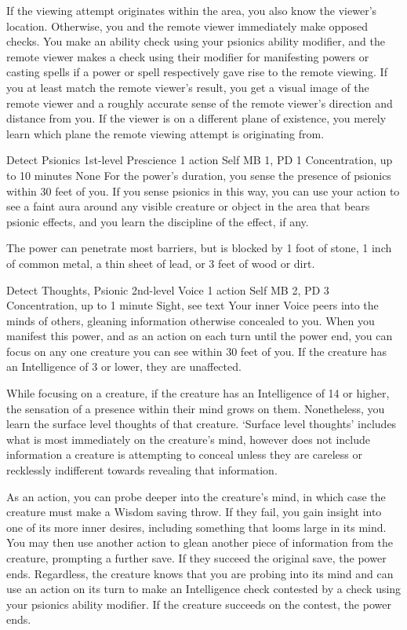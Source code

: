If the viewing attempt originates within the area, you also
know the viewer's location. Otherwise, you and the remote
viewer immediately make opposed checks. You make an ability
check using your psionics ability modifier, and the remote
viewer makes a check using their modifier for manifesting
powers or casting spells if a power or spell respectively
gave rise to the remote viewing. If you at least match the
remote viewer's result, you get a visual image of the remote
viewer and a roughly accurate sense of the remote viewer's
direction and distance from you.
If the viewer is on a different plane of existence,
you merely learn which plane the remote viewing attempt is
originating from.

\DndPowerHeader%
    {Detect Psionics\label{pwr:detect_psionics}}
    {1st-level Prescience}
    {1 action}
    {Self}
    {MB 1, PD 1}
    {Concentration, up to 10 minutes}
    {None}
For the power's duration, you sense the
presence of psionics within 30 feet of you. If you sense psionics
in this way, you can use your action to see a faint aura around
any visible creature or object in the area that bears psionic
effects, and you learn the discipline of the effect, if any.

The power can penetrate most barriers, but is blocked by 1
foot of stone, 1 inch of common metal, a thin sheet of lead,
or 3 feet of wood or dirt.

\DndPowerHeader%
    {Detect Thoughts, Psionic\label{pwr:detect_thoughts_psionic}}
    {2nd-level Voice}
    {1 action}
    {Self}
    {MB 2, PD 3}
    {Concentration, up to 1 minute}
    {Sight, see text}
Your inner Voice peers into the minds of others,
gleaning information otherwise concealed to you.
When you manifest this power,
and as an action on each turn until the power end,
you can focus on any one creature you can see within 30 feet of you.
If the creature has an Intelligence of 3 or lower,
they are unaffected.

While focusing on a creature,
if the creature has an Intelligence of 14 or higher,
the sensation of a presence within their mind grows on them.
Nonetheless,
you learn the surface level thoughts of that creature.
`Surface level thoughts' includes what is most
immediately on the creature's mind,
however does not include information a creature is attempting to conceal
unless they are careless or recklessly indifferent
towards revealing that information.

As an action,
you can probe deeper into the creature's mind,
in which case the creature must make a Wisdom saving throw.
If they fail,
you gain insight into one of its more inner desires,
including something that looms large in its mind.
You may then use another action to glean another piece of information
from the creature, prompting a further save.
If they succeed the original save, the power ends.
Regardless,
the creature knows that you are probing into its mind
and can use an action on its turn to make an Intelligence check
contested by a check using your psionics ability modifier.
If the creature succeeds on the contest,
the power ends.

